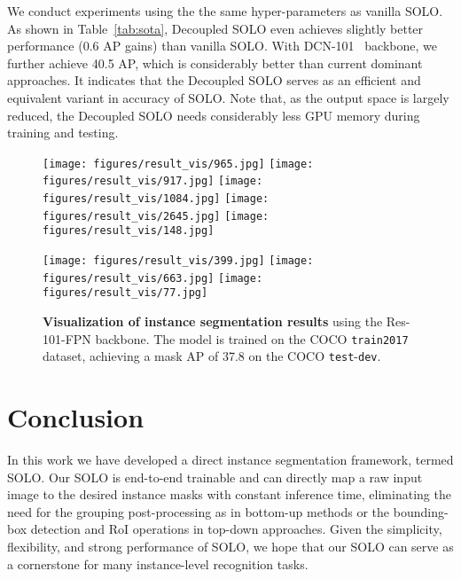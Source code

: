 \documentclass[runningheads]{llncs}
\def\OurMethod{{SOLO}\xspace}
\begin{document}
We conduct experiments using the the same hyper-parameters as vanilla \OurMethod.
As shown in Table~\ref{tab:sota},
Decoupled \OurMethod even achieves slightly better performance (0.6 AP gains) than vanilla \OurMethod.
With DCN-101~\cite{dcn} backbone, we further achieve 40.5 AP, which is considerably better than current dominant approaches.
It indicates that the Decoupled \OurMethod serves as an efficient and equivalent variant in accuracy of \OurMethod.
Note that, as the output space is largely reduced, the Decoupled \OurMethod needs considerably less GPU memory during training and testing.






\def\visimgheight{2.97cm}
\def\visimgwidth{3.86cm}



\begin{figure*}[ht]
\centering 
{


\texttt{[image: figures/result\_vis/965.jpg]}
\texttt{[image: figures/result\_vis/917.jpg]}
\texttt{[image: figures/result\_vis/1084.jpg]}
\texttt{[image: figures/result\_vis/2645.jpg]}
\texttt{[image: figures/result\_vis/148.jpg]}




\def\visimgheight2{2.65cm} 
\texttt{[image: figures/result\_vis/399.jpg]}
\texttt{[image: figures/result\_vis/663.jpg]}
\texttt{[image: figures/result\_vis/77.jpg]}






} \caption{\textbf{Visualization of instance segmentation results}
using the Res-101-FPN backbone.
The model is trained on the COCO \texttt{train2017} dataset, achieving a mask AP of 37.8 on the COCO \texttt{test}-\texttt{dev}.
}
\label{fig:some_vis}
\end{figure*}



 


\section{Conclusion}
In this work we have developed a direct instance segmentation framework, termed \OurMethod.
Our  \OurMethod is end-to-end trainable and can directly map a raw input image to the desired instance masks with constant inference time, eliminating the need for the grouping post-processing as in bottom-up methods or the bounding-box detection and RoI operations in top-down approaches.
Given the simplicity, flexibility, and strong performance of \OurMethod,
we hope that
our \OurMethod can serve as a cornerstone for many instance-level recognition tasks.
\end{document}
